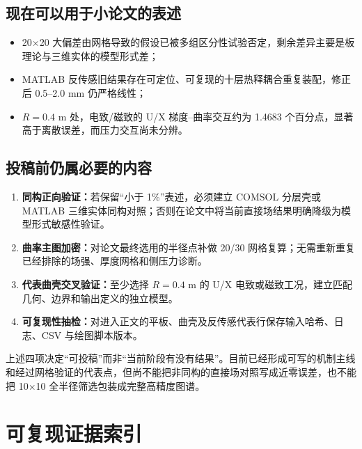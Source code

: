 \documentclass[UTF8,fontset=windows,11pt,a4paper]{ctexart}
\begin{document}
\subsection{现在可以用于小论文的表述}

\begin{itemize}
\item 20$\times$20 大偏差由网格导致的假设已被多组区分性试验否定，剩余差异主要是板理论与三维实体的模型形式差；
\item MATLAB 反传感旧结果存在可定位、可复现的十层热释耦合重复装配，修正后 0.5--2.0 mm 仍严格线性；
\item $R=0.4$ m 处，电致/磁致的 U/X 梯度--曲率交互约为 1.4683 个百分点，显著高于离散误差，而压力交互尚未分辨。
\end{itemize}

\subsection{投稿前仍属必要的内容}

\begin{enumerate}[label=\arabic*.]
\item \textbf{同构正向验证：}若保留“小于 1\%”表述，必须建立 COMSOL 分层壳或 MATLAB 三维实体同构对照；否则在论文中将当前直接场结果明确降级为模型形式敏感性验证。
\item \textbf{曲率主图加密：}对论文最终选用的半径点补做 20/30 网格复算；无需重新重复已经排除的场强、厚度网格和侧压力诊断。
\item \textbf{代表曲壳交叉验证：}至少选择 $R=0.4$ m 的 U/X 电致或磁致工况，建立匹配几何、边界和输出定义的独立模型。
\item \textbf{可复现性抽检：}对进入正文的平板、曲壳及反传感代表行保存输入哈希、日志、CSV 与绘图脚本版本。
\end{enumerate}

上述四项决定“可投稿”而非“当前阶段有没有结果”。目前已经形成可写的机制主线和经过网格验证的代表点，但尚不能把非同构的直接场对照写成近零误差，也不能把 10$\times$10 全半径筛选包装成完整高精度图谱。

\section{可复现证据索引}
\end{document}
